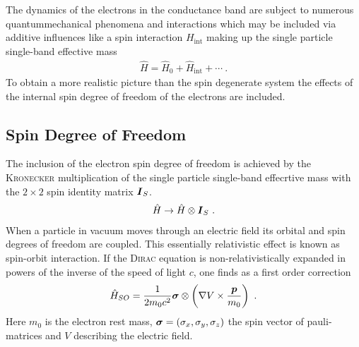 The dynamics of the electrons in the conductance band are subject to numerous quantummechanical phenomena and interactions which may be included via additive influences like a spin interaction \hamil{} $H_{\text{int}}$ making up the single particle single-band effective mass \hamil{}
\begin{align}
\hat{H} = \hat{H}_0 + \hat{H}_{\text{int}}+\dotsb \label{eqn:generalhamil}\ .
\end{align}
To obtain a more realistic picture than the spin degenerate system the effects of the internal spin degree of freedom of the electrons are included.
\subsection{Spin Degree of Freedom}
The inclusion of the electron spin degree of freedom is achieved by the \textsc{Kronecker} multiplication of the single particle single-band effecrtive mass \hamil{}  with the $2 \times 2$ spin identity matrix $\boldsymbol{I}_S$. 
\begin{align}
\hat{H} \rightarrow \hat{H} \otimes \boldsymbol{I}_S\ .
\end{align}
When a particle in vacuum moves through an electric field its orbital and spin degrees of freedom are coupled. This essentially relativistic effect is known as spin-orbit interaction. If the \textsc{Dirac} equation is non-relativistically expanded in powers of the inverse of the speed of light $c$, one finds as a first order correction\cite{Nowack2009Thesis}
\begin{align}
\hat{H}_{SO} = \frac{1}{2m_0c^2} \boldsymbol{\sigma} \otimes \left( \nabla V \times \frac{\boldsymbol{p}}{m_0}\right)\ .
\label{eqn:spinorbithamil}
\end{align}
Here $m_0$ is the electron rest mass, $\boldsymbol{\sigma} = (\sigma_x, \sigma_y,\sigma_z)$ the spin vector of pauli-matrices and $V$ describing the electric field. 
